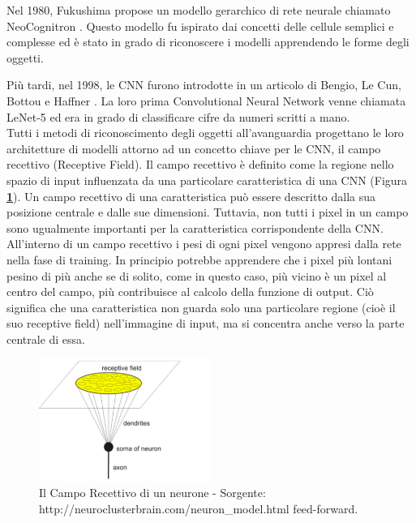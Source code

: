 Nel 1980, Fukushima propose un modello gerarchico di rete neurale chiamato NeoCognitron \cite{Fukushima1980}. Questo modello fu ispirato dai concetti delle cellule semplici e complesse ed è stato in grado di riconoscere i modelli apprendendo le forme degli oggetti.

Più tardi, nel 1998, le CNN furono introdotte in un articolo di Bengio, Le Cun, Bottou e Haffner \cite{Lecun98}. La loro prima Convolutional Neural Network venne chiamata LeNet-5 ed era in grado di classificare cifre da numeri scritti a mano.\\

Tutti i metodi di riconoscimento degli oggetti all'avanguardia progettano le loro architetture di modelli attorno ad un concetto chiave per le CNN, il campo recettivo (Receptive Field).
Il campo recettivo è definito come la regione nello spazio di input influenzata da una particolare caratteristica di una CNN (Figura \textbf{\ref{fig:receptivefield}}). Un campo recettivo di una caratteristica può essere descritto dalla sua posizione centrale e dalle sue dimensioni. Tuttavia, non tutti i pixel in un campo sono ugualmente importanti per la caratteristica corrispondente della CNN. All'interno di un campo recettivo i pesi di ogni pixel vengono appresi dalla rete nella fase di training. In principio potrebbe apprendere che i pixel più lontani pesino di più anche se di solito, come in questo caso, più vicino è un pixel al centro del campo, più contribuisce al calcolo della funzione di output. Ciò significa che una caratteristica non guarda solo una particolare regione (cioè il suo receptive field) nell'immagine di input, ma si concentra anche verso la parte centrale di essa. 

\begin{figure}
\centering
\includegraphics[width=%
0.5\textwidth]{figures/receptive_field}
\caption[Il Campo Recettivo di un neurone]{Il Campo Recettivo di un neurone - Sorgente: http://neuroclusterbrain.com/neuron\_model.html feed-forward.
\label{fig:receptivefield}}
\end{figure} 

